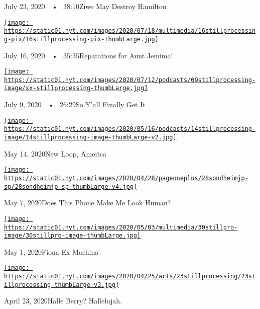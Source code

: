 July 23, 2020~~•~ 38:10Ziwe May Destroy Hamilton

\href{https://www.nytimes.com/2020/07/16/podcasts/reparations-for-aunt-jemima.html?action=click\&module=audio-series-bar\&region=header\&pgtype=Article}{\texttt{[image: https://static01.nyt.com/images/2020/07/18/multimedia/16stillprocessing-pix/16stillprocessing-pix-thumbLarge.jpg]}}

July 16, 2020~~•~ 35:35Reparations for Aunt Jemima!

\href{https://www.nytimes.com/2020/07/09/podcasts/still-processing-black-lives-matter.html?action=click\&module=audio-series-bar\&region=header\&pgtype=Article}{\texttt{[image: https://static01.nyt.com/images/2020/07/12/podcasts/09stillprocessing-image/xx-stillprocessing-thumbLarge.jpg]}}

July 9, 2020~~•~ 26:29So Y'all Finally Get It

\href{https://www.nytimes.com/2020/05/14/podcasts/still-processing-westworld-hollywood-utopia-dystopia.html?action=click\&module=audio-series-bar\&region=header\&pgtype=Article}{\texttt{[image: https://static01.nyt.com/images/2020/05/16/podcasts/14stillprocessing-image/14stillprocessing-image-thumbLarge-v2.jpg]}}

May 14, 2020New Loop, America

\href{https://www.nytimes.com/2020/05/07/podcasts/still-processing-internet-vulnerability-sondheim-parks-recreation.html?action=click\&module=audio-series-bar\&region=header\&pgtype=Article}{\texttt{[image: https://static01.nyt.com/images/2020/04/28/pageoneplus/28sondheimjp-sp/28sondheimjp-sp-thumbLarge-v4.jpg]}}

May 7, 2020Does This Phone Make Me Look Human?

\href{https://www.nytimes.com/2020/04/30/podcasts/still-processing-fiona-apple-fetch-bolt-cutters.html?action=click\&module=audio-series-bar\&region=header\&pgtype=Article}{\texttt{[image: https://static01.nyt.com/images/2020/05/03/multimedia/30stillpro-image/30stillpro-image-thumbLarge.jpg]}}

May 1, 2020Fiona Ex Machina

\href{https://www.nytimes.com/2020/04/23/podcasts/still-processing-halle-berry-sharon-stone-catwoman-quarantine.html?action=click\&module=audio-series-bar\&region=header\&pgtype=Article}{\texttt{[image: https://static01.nyt.com/images/2020/04/25/arts/23stillprocessing/23stillprocessing-thumbLarge-v3.jpg]}}

April 23, 2020Halle Berry? Hallelujah.

